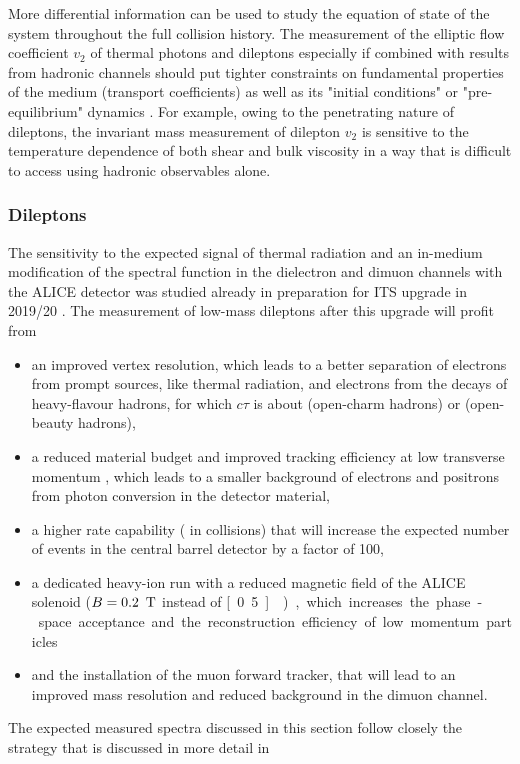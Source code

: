 \documentclass[../report.tex]{subfiles}
\begin{document}
More differential information can be used to study the equation of state of the system throughout the full collision history. The measurement of the elliptic flow coefficient $v_2$ of thermal photons and dileptons especially if combined with results from hadronic channels should put tighter constraints on fundamental properties of the medium (\eg transport coefficients) as well as its "initial conditions" or "pre-equilibrium" dynamics \cite{Vujanovic:2016anq}. For example, owing to the penetrating nature of dileptons, the invariant mass measurement of dilepton $v_2$ is sensitive to the temperature dependence of both shear \cite{Vujanovic:2017psb} and bulk viscosity \cite{Vujanovic:2017wtw} in a way that is difficult to access using hadronic observables alone.




\subsubsection{Dileptons}
\label{sec:thermalradiation:dileptons}

The sensitivity to the expected signal of thermal radiation and an in-medium modification of the \PGr spectral function in the dielectron and dimuon channels with the ALICE detector \cite{Aamodt:2008zz,Abelev:2014ffa} was studied already in preparation for ITS upgrade in 2019/20 \cite{Abelevetal:2014cna,Abelevetal:2014dna,ALICE:2014qrd,ALICE:MFTLoI}. The measurement of low-mass dileptons after this upgrade will profit from  
\begin{itemize}
\item an improved vertex resolution, which leads to a better separation of electrons from prompt sources, like thermal radiation, and electrons from the decays of heavy-flavour hadrons, for which $c\tau$ is about \unit[150]{\Uum} (open-charm hadrons) or \unit[400]{\Uum} (open-beauty hadrons), 
\item a reduced material budget and improved tracking efficiency at low transverse momentum \pT, which leads to a smaller background of electrons and positrons from photon conversion in the detector material,
\item a higher rate capability (\unit[50]{\UkHz} in \PbPb{} collisions) that will increase the expected number of events in the central barrel detector by a factor of 100, 
\item a dedicated heavy-ion run with a reduced magnetic field of the ALICE solenoid ($B=\unit[0.2]{\UT}$ instead of \unit[0.5]{\UT}), which increases the phase-space acceptance and the reconstruction efficiency of low momentum particles 
\item and the installation of the muon forward tracker, that will lead to an improved mass resolution and reduced background in the dimuon channel.
\end{itemize}
The expected measured spectra discussed in this section follow closely the strategy that is discussed in more detail in \cite{Abelevetal:2014cna,Abelevetal:2014dna,ALICE:2014qrd,ALICE:MFTLoI}
\end{document}
